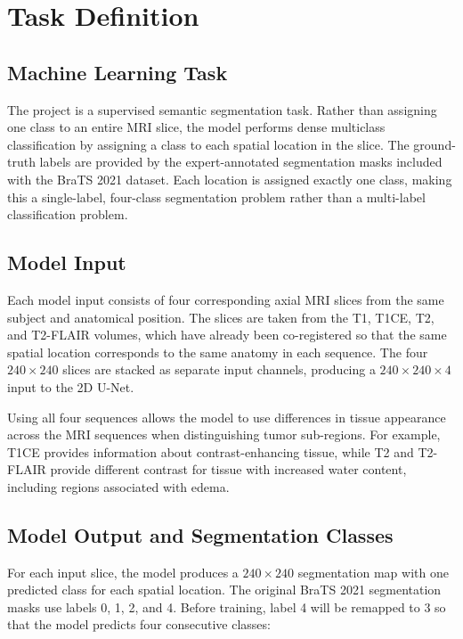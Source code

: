 
\section{Task Definition}

\subsection{Machine Learning Task}

The project is a supervised semantic segmentation task. Rather than assigning
one class to an entire MRI slice, the model performs dense multiclass
classification by assigning a class to each spatial location in the slice.
The ground-truth labels are provided by the expert-annotated segmentation masks
included with the BraTS 2021 dataset. Each location is assigned exactly one
class, making this a single-label, four-class segmentation problem rather than
a multi-label classification problem.

\subsection{Model Input}

Each model input consists of four corresponding axial MRI slices from the same
subject and anatomical position. The slices are taken from the T1, T1CE, T2,
and T2-FLAIR volumes, which have already been co-registered so that the same
spatial location corresponds to the same anatomy in each sequence. The four
$240 \times 240$ slices are stacked as separate input channels, producing a
$240 \times 240 \times 4$ input to the 2D U-Net.

Using all four sequences allows the model to use differences in tissue
appearance across the MRI sequences when distinguishing tumor sub-regions.
For example, T1CE provides information about contrast-enhancing tissue, while
T2 and T2-FLAIR provide different contrast for tissue with increased water
content, including regions associated with edema.

\subsection{Model Output and Segmentation Classes}

For each input slice, the model produces a $240 \times 240$ segmentation map
with one predicted class for each spatial location. The original BraTS 2021
segmentation masks use labels 0, 1, 2, and 4. Before training, label 4 will be
remapped to 3 so that the model predicts four consecutive classes:

